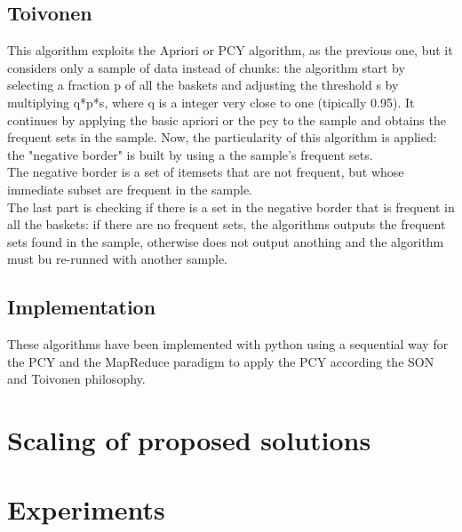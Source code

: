 \documentclass[14pt]{extarticle}
\begin{document}
\subsection{Toivonen}
This algorithm exploits the Apriori or PCY algorithm, as the previous one, but it considers only a sample of data instead of chunks: 
the algorithm start by selecting a fraction p of all the baskets and adjusting the threshold s by multiplying q*p*s, where q is a integer very close to one (tipically 0.95). It continues by applying the basic apriori or the pcy to the sample and obtains the frequent sets in the sample. Now, the particularity of this algorithm is applied: the "negative border" is built by using a the sample's frequent sets.\\
The negative border is a set of itemsets that are not frequent, but whose immediate subset are frequent in the sample.\\
The last part is checking if there is a set in the negative border that is frequent in all the baskets: if there are no frequent sets, the algorithms outputs the frequent sets found in the sample, otherwise does not output anothing and the algorithm must bu re-runned with another sample.

\subsection{Implementation}
These algorithms have been implemented with python using a sequential way for the PCY and the MapReduce paradigm to apply the PCY according the SON and Toivonen philosophy.


\section{Scaling of proposed solutions}
\section{Experiments}
\end{document}
